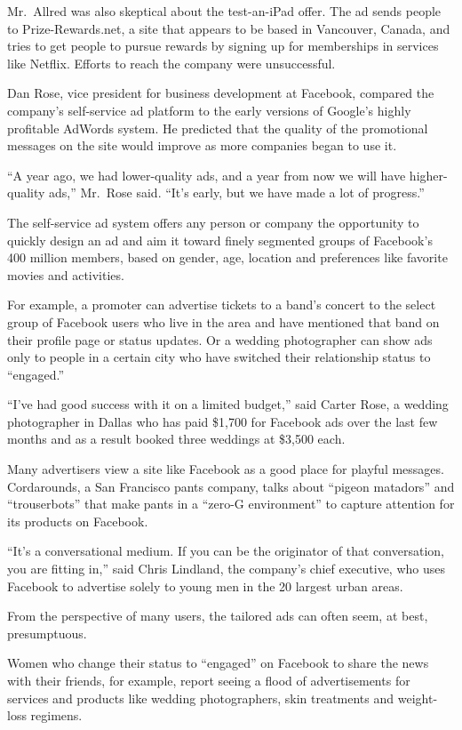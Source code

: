 ﻿\documentclass[12pt]{article}
\begin{document}
Mr.~Allred was also skeptical about the test-an-iPad offer. The ad sends people to
Prize-Rewards.net, a site that appears to be based in Vancouver, Canada, and tries to get people to
pursue rewards by signing up for memberships in services like Netflix. Efforts to reach the company
were unsuccessful.

Dan Rose, vice president for business development at Facebook, compared the company's self-service
ad platform to the early versions of Google's highly profitable AdWords system. He predicted that
the quality of the promotional messages on the site would improve as more companies began to use it.

``A year ago, we had lower-quality ads, and a year from now we will have higher-quality ads,''
Mr.~Rose said. ``It's early, but we have made a lot of progress.''

The self-service ad system offers any person or company the opportunity to quickly design an ad and
aim it toward finely segmented groups of Facebook's 400 million members, based on gender, age,
location and preferences like favorite movies and activities.

For example, a promoter can advertise tickets to a band's concert to the select group of Facebook
users who live in the area and have mentioned that band on their profile page or status updates. Or
a wedding photographer can show ads only to people in a certain city who have switched their
relationship status to ``engaged.''

``I've had good success with it on a limited budget,'' said Carter Rose, a wedding photographer in
Dallas who has paid \$1,700 for Facebook ads over the last few months and as a result booked three
weddings at \$3,500 each.

Many advertisers view a site like Facebook as a good place for playful messages. Cordarounds, a San
Francisco pants company, talks about ``pigeon matadors'' and ``trouserbots'' that make pants in a
``zero-G environment'' to capture attention for its products on Facebook.

``It's a conversational medium. If you can be the originator of that conversation, you are fitting
in,'' said Chris Lindland, the company's chief executive, who uses Facebook to advertise solely to
young men in the 20 largest urban areas.

From the perspective of many users, the tailored ads can often seem, at best, presumptuous.

Women who change their status to ``engaged'' on Facebook to share the news with their friends, for
example, report seeing a flood of advertisements for services and products like wedding
photographers, skin treatments and weight-loss regimens.
\end{document}
